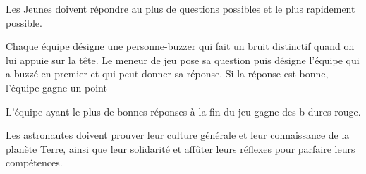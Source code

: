 \documentclass{grand-jeu}
\begin{document}
\begin{liste-materiel}
\end{liste-materiel}

\begin{regles}
Les Jeunes doivent répondre au plus de questions possibles et le plus rapidement possible. 

Chaque équipe désigne une personne-buzzer qui fait un bruit distinctif quand on lui appuie sur la tête.
Le meneur de jeu pose sa question puis désigne l'équipe qui a buzzé en premier et qui peut donner sa réponse. Si la réponse est bonne, l'équipe gagne un point

L'équipe ayant le plus de bonnes réponses à la fin du jeu gagne des b-dures rouge. 
\end{regles}

\begin{imaginaire}
Les astronautes doivent prouver leur culture générale et leur connaissance de la planète Terre, ainsi que leur solidarité et affûter leurs réflexes pour parfaire leurs compétences.
\end{imaginaire}

\begin{moments-stop}
\end{moments-stop}
\end{document}
